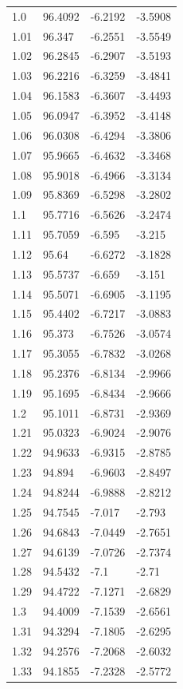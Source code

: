 \begin{tabular}{llll}
1.0 & 96.4092 & -6.2192 & -3.5908 \\
1.01 & 96.347 & -6.2551 & -3.5549 \\
1.02 & 96.2845 & -6.2907 & -3.5193 \\
1.03 & 96.2216 & -6.3259 & -3.4841 \\
1.04 & 96.1583 & -6.3607 & -3.4493 \\
1.05 & 96.0947 & -6.3952 & -3.4148 \\
1.06 & 96.0308 & -6.4294 & -3.3806 \\
1.07 & 95.9665 & -6.4632 & -3.3468 \\
1.08 & 95.9018 & -6.4966 & -3.3134 \\
1.09 & 95.8369 & -6.5298 & -3.2802 \\
1.1 & 95.7716 & -6.5626 & -3.2474 \\
1.11 & 95.7059 & -6.595 & -3.215 \\
1.12 & 95.64 & -6.6272 & -3.1828 \\
1.13 & 95.5737 & -6.659 & -3.151 \\
1.14 & 95.5071 & -6.6905 & -3.1195 \\
1.15 & 95.4402 & -6.7217 & -3.0883 \\
1.16 & 95.373 & -6.7526 & -3.0574 \\
1.17 & 95.3055 & -6.7832 & -3.0268 \\
1.18 & 95.2376 & -6.8134 & -2.9966 \\
1.19 & 95.1695 & -6.8434 & -2.9666 \\
1.2 & 95.1011 & -6.8731 & -2.9369 \\
1.21 & 95.0323 & -6.9024 & -2.9076 \\
1.22 & 94.9633 & -6.9315 & -2.8785 \\
1.23 & 94.894 & -6.9603 & -2.8497 \\
1.24 & 94.8244 & -6.9888 & -2.8212 \\
1.25 & 94.7545 & -7.017 & -2.793 \\
1.26 & 94.6843 & -7.0449 & -2.7651 \\
1.27 & 94.6139 & -7.0726 & -2.7374 \\
1.28 & 94.5432 & -7.1 & -2.71 \\
1.29 & 94.4722 & -7.1271 & -2.6829 \\
1.3 & 94.4009 & -7.1539 & -2.6561 \\
1.31 & 94.3294 & -7.1805 & -2.6295 \\
1.32 & 94.2576 & -7.2068 & -2.6032 \\
1.33 & 94.1855 & -7.2328 & -2.5772 \\

\end{tabular}
